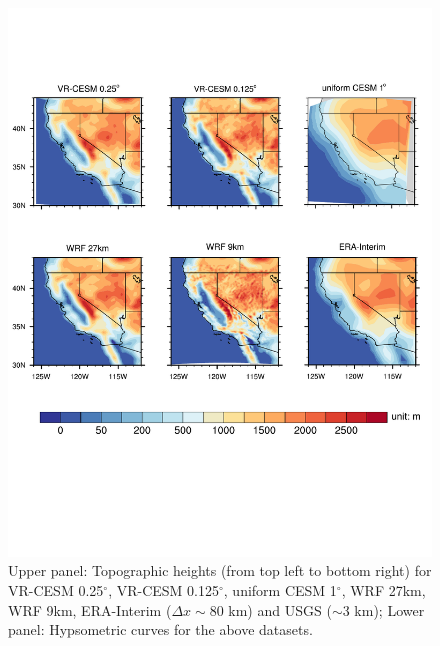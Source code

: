 \documentclass[ms]{agutex}   %
\begin{document}
\begin{figure}
\begin{center}
\includegraphics[width=6in]{topo.pdf}
\end{center}
\caption{Upper panel: Topographic heights (from top left to bottom right) for VR-CESM 0.25$^\circ$, VR-CESM 0.125$^\circ$, uniform CESM 1$^\circ$, WRF 27km, WRF 9km, ERA-Interim ($\Delta x \sim$80 km) and USGS ($\sim$3 km); Lower panel: Hypsometric curves for the above datasets.} \label{fig:Figure 2} 
\end{figure}
\end{document}
